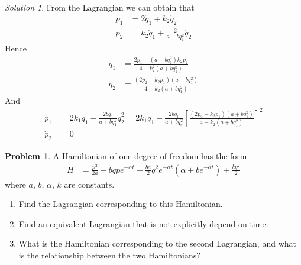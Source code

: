 \documentclass[twoside,11pt]{article}
\newcommand{\lms}{\fontfamily{lmss}\selectfont} %
\theoremstyle{definition}
\newtheorem{problem}{\lms Problem}
\theoremstyle{remark}
\newtheorem*{solution}{Solution}
\begin{document}
\begin{solution}
From the Lagrangian we can obtain that
\begin{align*}
    p_1 &= 2\dot q_1 + k_2\dot q_2\\
    p_2 &= k_2\dot q_1 + \frac{2}{a + bq_1^2}\dot q_2
\end{align*}
Hence
\begin{align*}
    \dot q_1 &= \frac{2p_1 - (a+bq_1^2)k_2p_2}{4 - k_2^2(a+bq_1^2)}\\
    \dot q_2 &= \frac{(2p_2 - k_2p_1)(a + bq_1^2)}{4 - k_2(a + bq_1^2)}
\end{align*}
And 
\begin{align*}
    \dot p_1 &= 2k_1q_1 - \frac{2bq_1}{a + bq_1^2}\dot q_2^2
    = 2k_1q_1 - \frac{2bq_1}{a + bq_q^2}\left[ 
        \frac{(2p_2 - k_2p_1)(a + bq_1^2)}{4 - k_2(a + bq_1^2)}
    \right]^2
    \\
    \dot p_2 &= 0
\end{align*}
\end{solution}



\begin{problem}
A Hamiltonian of one degree of freedom has the form
\begin{align}
    H &= \frac{p^2}{2a} - bqpe^{-\alpha t} + 
    \frac{ba}{2}q^2e^{-\alpha t}(\alpha + be^{-\alpha t})
    + \frac{kq^2}{2}
\end{align}
where $a$, $b$, $\alpha$, $k$ are constants.
\begin{enumerate}[label=\alph*)]
    \item Find the Lagrangian corresponding to this Hamiltonian.
    \item Find an equivalent Lagrangian that is not explicitly depend
        on time.
    \item What is the Hamiltonian corresponding to the second Lagrangian,
        and what is the relationship between the two Hamiltonians?
\end{enumerate}
\end{problem}
\end{document}
